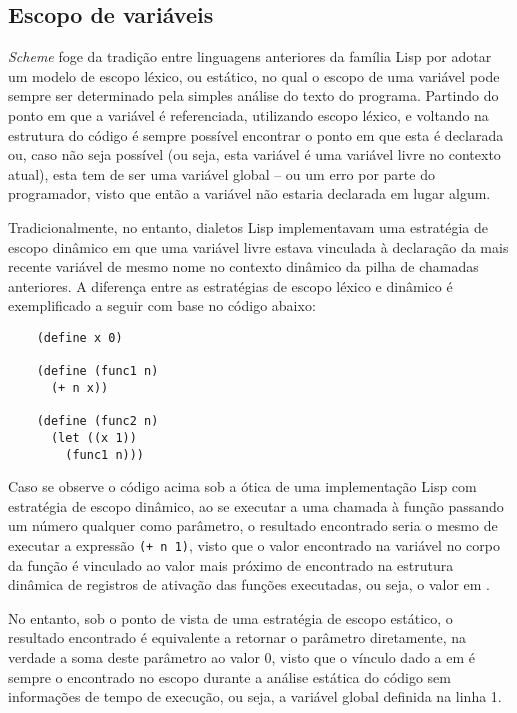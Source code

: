 \subsection{Escopo de variáveis}

\textit{Scheme} foge da tradição entre linguagens anteriores da família Lisp
por adotar um modelo de escopo léxico, ou estático, no qual o escopo de uma
variável pode sempre ser determinado pela simples análise do texto do programa.
Partindo do ponto em que a variável é referenciada, utilizando escopo léxico, e
voltando na estrutura do código é sempre possível encontrar o ponto em que esta
é declarada ou, caso não seja possível (ou seja, esta variável é uma variável
livre no contexto atual), esta tem de ser uma variável global -- ou um erro por
parte do programador, visto que então a variável não estaria declarada em lugar
algum.

Tradicionalmente, no entanto, dialetos Lisp implementavam uma estratégia de
escopo dinâmico em que uma variável livre estava vinculada à declaração da mais
recente variável de mesmo nome no contexto dinâmico da pilha de chamadas
anteriores. A diferença entre as estratégias de escopo léxico e dinâmico é 
exemplificado a seguir com base no código abaixo:

\begin{lstlisting}
    (define x 0)
    
    (define (func1 n) 
      (+ n x))
    
    (define (func2 n) 
      (let ((x 1))
        (func1 n)))
\end{lstlisting}

Caso se observe o código acima sob a ótica de uma implementação Lisp com
estratégia de escopo dinâmico, ao se executar a uma chamada à função
 passando um número qualquer  como parâmetro, o resultado
encontrado seria o mesmo de executar a expressão \texttt{(+ n 1)}, visto que o
valor encontrado na variável  no corpo da função  é
vinculado ao valor mais próximo de  encontrado na estrutura dinâmica de
registros de ativação das funções executadas, ou seja, o valor em .

No entanto, sob o ponto de vista de uma estratégia de escopo estático, o
resultado encontrado é equivalente a retornar o parâmetro diretamente, na
verdade a soma deste parâmetro ao valor 0, visto que o vínculo dado a 
em  é sempre o encontrado no escopo durante a análise estática do
código sem informações de tempo de execução, ou seja, a variável global
definida na linha 1.

